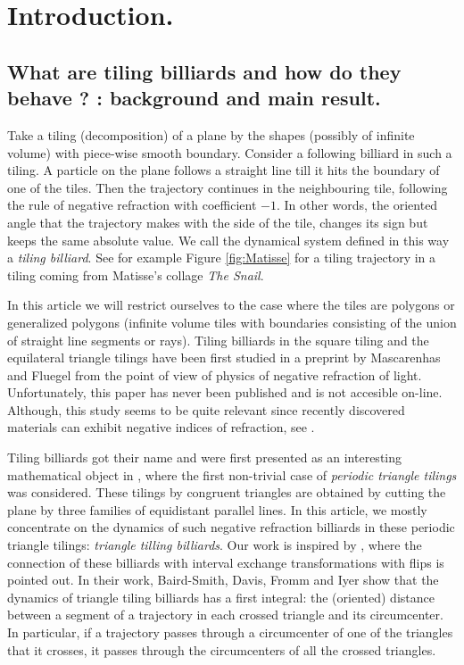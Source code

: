 \documentclass[12pt]{article}
\theoremstyle{definition}
\begin{document}
\section{Introduction.}
\subsection{What are tiling billiards and how do they behave ? : background and main result.}


Take a tiling (decomposition) of a plane by the shapes (possibly of infinite volume) with piece-wise smooth boundary. Consider a following billiard in such a tiling. A particle on the plane follows a straight line till it hits the boundary of one of the tiles. Then the trajectory continues in the neighbouring tile, following the rule of negative refraction with coefficient $-1$. In other words, the oriented angle that the trajectory makes with the side of the tile, changes its sign but keeps the same absolute value. We call the dynamical system defined in this way a \emph{tiling billiard}. See for example Figure \ref{fig:Matisse} for a tiling trajectory in a tiling coming from Matisse's collage \emph{The Snail}. 

In this article we will restrict ourselves to the case where the tiles are polygons or generalized polygons (infinite volume tiles with boundaries consisting of the union of straight line segments or rays). Tiling billiards in the square tiling and the equilateral triangle tilings have been first studied in a preprint \cite{MF} by Mascarenhas and Fluegel from the point of view of physics of negative refraction of light. Unfortunately, this paper has never been published and is not accesible on-line. Although, this study seems to be quite relevant since recently discovered materials can exhibit negative indices of refraction, see \cite{SSS01, SPW04, VZZ08}.

Tiling billiards got their name and were first presented as an interesting mathematical object in \cite{DDRSL16}, where the first non-trivial case of \emph{periodic triangle tilings} was considered. These tilings by congruent triangles are obtained by cutting the plane by three families of equidistant parallel lines. In this article, we mostly concentrate on the dynamics of such negative refraction billiards in these periodic triangle tilings: \emph{triangle tilling billiards}. Our work is inspired by \cite{BDFI18}, where the connection of these billiards with interval exchange transformations with flips is pointed out. In their work, Baird-Smith, Davis, Fromm and Iyer show that the dynamics of triangle tiling billiards has a first integral: the (oriented) distance between a segment of a trajectory in each crossed triangle and its circumcenter.
In particular, if a trajectory passes through a circumcenter of one of the triangles that it crosses, it passes through the circumcenters of all the crossed triangles. 
\end{document}
